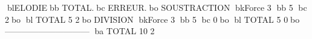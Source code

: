 blELODIEbb           TOTAL.bc      ERREUR.bo
SOUSTRACTION
bkForce      3     bb  5	bc        2bo
bl TOTAL             5	        2bo
DIVISION
bkForce      3     bb  5	bc        0bo
bl TOTAL             5	        0bo
------------------------------
ba TOTAL            10	        2
